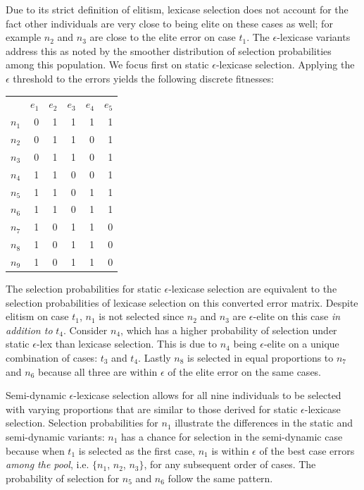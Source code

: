 \documentclass[twoside]{article}
\begin{document}
Due to its strict definition of elitism, lexicase selection does not account for the fact other individuals are very close to being elite on these cases as well; for example $n_2$ and $n_3$ are close to the elite error on case $t_1$. The $\epsilon$-lexicase variants address this as noted by the smoother distribution of selection probabilities among this population. We focus first on static $\epsilon$-lexicase selection. Applying the $\epsilon$ threshold to the errors yields the following discrete fitnesses:

\begin{center}
\begin{tabular}{lrrrrr}
& $e_1$ & $e_2$ & $e_3$ & $e_4$ & $e_5$ \\
$n_1$	&0	&	1	&	1	&	1	&	1\\ 
$n_2$	&0	&	1	&	1	&	0	&	1\\ 
$n_3$	&0	&	1	&	1	&	0	&	1\\ 
$n_4$	&1	&	1	&	0	&	0	&	1\\ 
$n_5$	&1	&	1	&	0	&	1	&	1\\ 
$n_6$	&1	&	1	&	0	&	1	&	1\\ 
$n_7$	&1	&	0	&	1	&	1	&	0\\ 
$n_8$	&1	&	0	&	1	&	1	&	0\\ 
$n_9$	&1	&	0	&	1	&	1	&	0\\ 
\end{tabular}
\end{center}
 
The selection probabilities for static $\epsilon$-lexicase selection are equivalent to the selection probabilities of lexicase selection on this converted error matrix. Despite elitism on case $t_1$, $n_1$ is not selected since $n_2$ and $n_3$ are $\epsilon$-elite on this case {\it in addition to} $t_4$. Consider $n_4$, which has a higher probability of selection under static $\epsilon$-lex than lexicase selection. This is due to $n_4$ being $\epsilon$-elite on a unique combination of cases: $t_3$ and $t_4$. Lastly $n_8$ is selected in equal proportions to $n_7$ and $n_6$ because all three are within $\epsilon$ of the elite error on the same cases. 

Semi-dynamic $\epsilon$-lexicase selection allows for all nine individuals to be selected with varying proportions that are similar to those derived for static $\epsilon$-lexicase selection. Selection probabilities for $n_1$ illustrate the differences in the static and semi-dynamic variants: $n_1$ has a chance for selection in the semi-dynamic case because when $t_1$ is selected as the first case, $n_1$ is within $\epsilon$ of the best case errors {\it among the pool}, i.e. $\{n_1$, $n_2$, $n_3\}$, for any subsequent order of cases. The probability of selection for $n_5$ and $n_6$ follow the same pattern.
\end{document}
